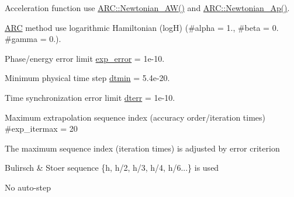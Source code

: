 \begin{DoxyItemize}
\item Acceleration function use \hyperlink{namespaceNTA_a831c3f8f362f34f1f987ee158e38c016}{A\+R\+C\+::\+Newtonian\+\_\+\+A\+W()} and \hyperlink{namespaceNTA_ac086c632a4f16eddc70f023f269d9c94}{A\+R\+C\+::\+Newtonian\+\_\+\+Ap()}.
\item \hyperlink{namespaceARC}{A\+RC} method use logarithmic Hamiltonian (logH) (\#alpha = 1., \#beta = 0. \#gamma = 0.).
\item Phase/energy error limit \hyperlink{classARC_1_1chainpars_aa2d74e007387438a5c9a36a7b29cbd1f}{exp\+\_\+error} = 1e-\/10.
\item Minimum physical time step \hyperlink{classARC_1_1chainpars_ae98a65b98d493759187d9790c6d746ef}{dtmin} = 5.\+4e-\/20.
\item Time synchronization error limit \hyperlink{classARC_1_1chainpars_aad7c1a9303c1bba721d08670961ba3f3}{dterr} = 1e-\/10.
\item Maximum extrapolation sequence index (accuracy order/iteration times) \#exp\+\_\+itermax = 20
\item The maximum sequence index (iteration times) is adjusted by error criterion
\item Bulirsch \& Stoer sequence \{h, h/2, h/3, h/4, h/6...\} is used
\item No auto-\/step 
\end{DoxyItemize}\hypertarget{classARC_1_1chainpars_aa52fe89cf4e13a3d8062324c6a2fd22f}{}\label{classARC_1_1chainpars_aa52fe89cf4e13a3d8062324c6a2fd22f} 
